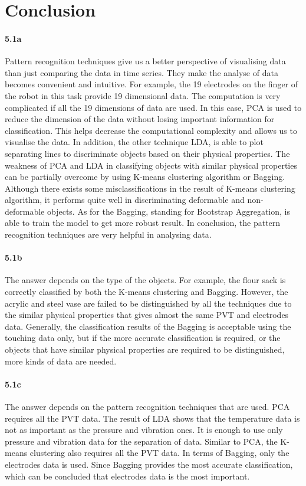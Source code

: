 \documentclass[10pt,twocolumn,letterpaper]{article}
\begin{document}
\section{Conclusion}
\paragraph{5.1a} 
Pattern recognition techniques give us a better perspective of visualising data than just comparing the data in time series. They make the analyse of data becomes convenient and intuitive. For example, the 19 electrodes on the finger of the robot in this task provide 19 dimensional data. The computation is very complicated if all the 19 dimensions of data are used. In this case, PCA is used to reduce the dimension of the data without losing important information for classification. This helps decrease the computational complexity and allows us to visualise the data. In addition, the other technique LDA, is able to plot separating lines to discriminate objects based on their physical properties. The weakness of PCA and LDA in classifying objects with similar physical properties can be partially overcome by using K-means clustering algorithm or Bagging. Although there exists some misclassifications in the result of K-means clustering algorithm, it performs quite well in discriminating deformable and non-deformable objects. As for the Bagging, standing for Bootstrap Aggregation, is able to train the model to get more robust result. In conclusion, the pattern recognition techniques are very helpful in analysing data.

\paragraph{5.1b}
The answer depends on the type of the objects. For example, the flour sack is correctly classified by both the K-means clustering and Bagging. However, the acrylic and steel vase are failed to be distinguished by all the techniques due to the similar physical properties that gives almost the same PVT and electrodes data. Generally, the classification results of the Bagging is acceptable using the touching data only, but if the more accurate classification is required, or the objects that have similar physical properties are required to be distinguished, more kinds of data are needed.

\paragraph{5.1c}
The answer depends on the pattern recognition techniques that are used. PCA requires all the PVT data. The result of LDA shows that the temperature data is not as important as the pressure and vibration ones. It is enough to use only pressure and vibration data for the separation of data. Similar to PCA, the K-means clustering also requires all the PVT data. In terms of Bagging, only the electrodes data is used. Since Bagging provides the most accurate classification, which can be concluded that electrodes data is the most important.
\end{document}
